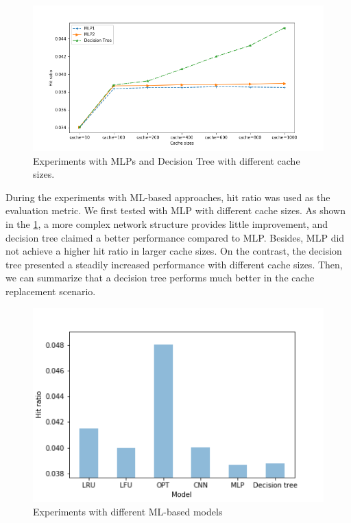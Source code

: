 \documentclass[letterpaper,twocolumn,10pt]{article}
\begin{document}
\begin{figure}[!ht]
	\centering 
	\includegraphics[width=0.38\textheight]{NN_hit.png}
	\caption{ Experiments with MLPs and Decision Tree with different cache sizes.
}
	\label{fig:nn_hit}
\end{figure}

During the experiments with ML-based approaches, hit ratio was used as the evaluation metric. We first tested with MLP with different cache sizes. As shown in the \ref{fig:nn_hit}, a more complex network structure provides little improvement, and decision tree claimed a better performance compared to MLP. Besides, MLP did not achieve a higher hit ratio in larger cache sizes. On the contrast, the decision tree presented a steadily increased performance with different cache sizes. Then, we can summarize that a decision tree performs much better in the cache replacement scenario.

\begin{figure}[!ht]
	\centering 
	\includegraphics[width=0.38\textheight]{CNN_DNN_DT.png}
	\caption{Experiments with different ML-based models
}
	\label{fig:cnn_dnn_dt}
\end{figure}
\end{document}
